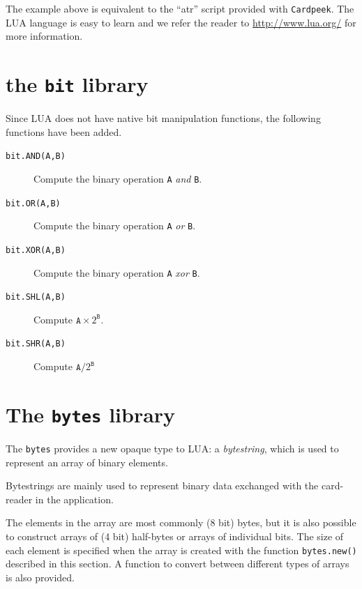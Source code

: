 \documentclass[11pt]{report}
\begin{document}
The example above is equivalent to the ``atr'' script provided with \texttt{Cardpeek}.
The LUA language is easy to learn and we refer the reader to \url{http://www.lua.org/} for more information.

\section{the \texttt{bit} library}

Since LUA does not have native bit manipulation functions, the following functions have been added.

\begin{description}

\item[\texttt{bit.AND(A,B)}]
{Compute the binary operation \texttt{A} \textit{and} \texttt{B}.}

\item[\texttt{bit.OR(A,B)}]
{Compute the binary operation \texttt{A} \textit{or} \texttt{B}.}

\item[\texttt{bit.XOR(A,B)}]
{Compute the binary operation \texttt{A} \textit{xor} \texttt{B}.}

\item[\texttt{bit.SHL(A,B)}]
{Compute $\texttt{A}{\times}2^{\texttt{B}}$.}

\item[\texttt{bit.SHR(A,B)}]
{Compute $\texttt{A}/2^{\texttt{B}}$}

\end{description}

\section{The \texttt{bytes} library}

The \texttt{bytes} provides a new opaque type to LUA: a \textit{bytestring}, 
which is used to represent an array of binary elements. 

Bytestrings are mainly used to represent binary data exchanged with
the card-reader in the application.

The elements in the array are most commonly (8 bit) bytes, but
it is also possible to construct arrays of (4 bit) half-bytes or
arrays of individual bits. The size of each element is specified 
when the array is created with the function \texttt{bytes.new()}
described in this section. A function to convert between different 
types of arrays is also provided.
\end{document}
